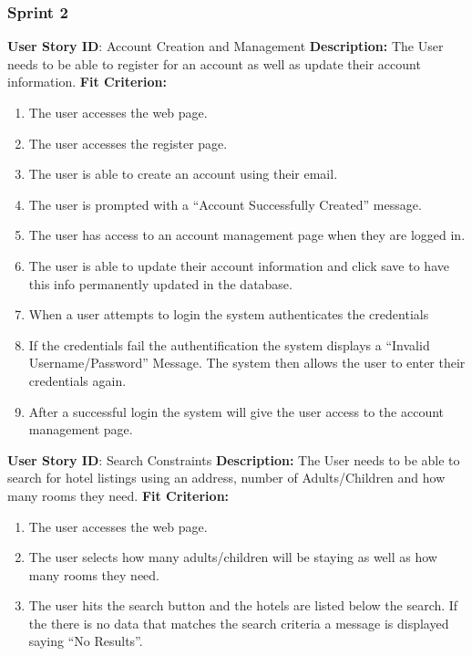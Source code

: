 \documentclass[]{article}
\begin{document}
\subsubsection{Sprint 2}
\textbf{User Story ID}: Account Creation and Management\newline
\textbf{Description:} The User needs to be able to register for an account as well as update their account information.\newline
\textbf{Fit Criterion:}
\begin{enumerate}
    \item The user accesses the web page.
    \item The user accesses the register page.
    \item The user is able to create an account using their email.
    \item The user is prompted with a “Account Successfully Created” message.
    \item The user has access to an account management page when they are logged in.
    \item The user is able to update their account information and click save to have this info permanently updated in the database.
    \item When a user attempts to login the system authenticates the credentials
    \item If the credentials fail the authentification the system displays a “Invalid Username/Password” Message. The system then allows the user to enter their credentials again.
    \item After a successful login the system will give the user access to the account management page.
\end{enumerate}

\noindent
\textbf{User Story ID}: Search Constraints\newline
\textbf{Description:} The User needs to be able to search for hotel listings using an address, number of Adults/Children and how many rooms they need.\newline
\textbf{Fit Criterion:}
\begin{enumerate}
    \item The user accesses the web page.
    \item The user selects how many adults/children will be staying as well as how many rooms they need.
    \item The user hits the search button and the hotels are listed below the search. If the there is no data that matches the search criteria a message is displayed saying “No Results”.
\end{enumerate}
\end{document}
